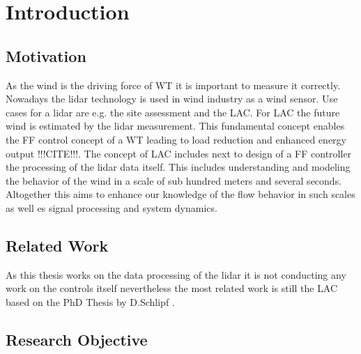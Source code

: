 \chapter{Introduction} \label{cha:INT}
\section{Motivation}\label{sec:Mot}
As the wind is the driving force of \gls{WT} it is important to measure it correctly. Nowadays the \gls{lidar} technology is used in wind industry as a wind sensor. Use cases for a \gls{lidar} are e.g. the site assessment and the \gls{LAC}. For \gls{LAC} the future wind is estimated by the \gls{lidar} measurement. This fundamental concept enables the \gls{FF} control concept of a \gls{WT} leading to load reduction and enhanced energy output !!!CITE!!!. The concept of \gls{LAC} includes next to design of a \gls{FF} controller the processing of the \gls{lidar} data itself. This includes understanding and modeling the behavior of the wind in a scale of sub hundred meters and several seconds. Altogether this aims to enhance our knowledge of the flow behavior in such scales as well es signal processing and system dynamics.

\section{Related Work}\label{sec:RelWork}
As this thesis works on the data processing of the \gls{lidar} it is not conducting any work on the controls itself nevertheless the most related work is still the \gls{LAC} based on the PhD Thesis by D.Schlipf \cite{Schlipf2015}.  







\section{Research Objective}